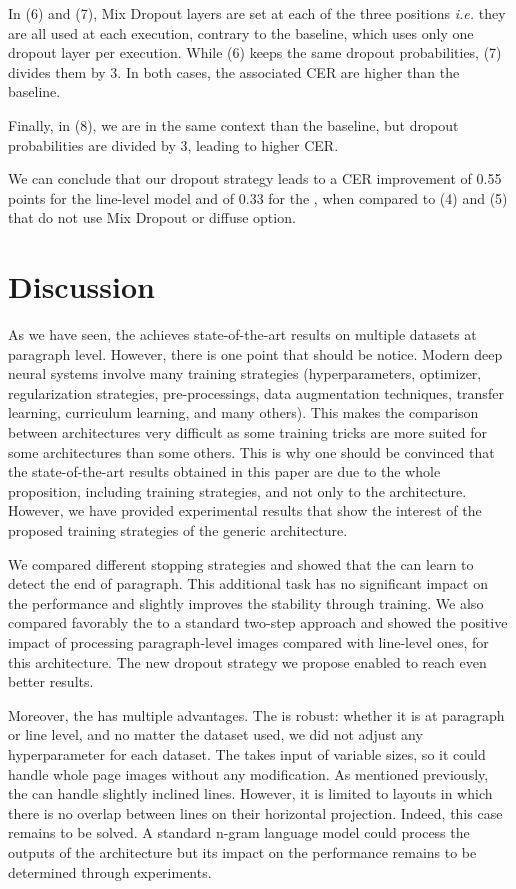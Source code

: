 In (6) and (7), Mix Dropout layers are set at each of the three positions \textit{i.e.} they are all used at each execution, contrary to the baseline, which uses only one dropout layer per execution. While (6) keeps the same dropout probabilities, (7) divides them by 3. In both cases, the associated CER are higher than the baseline.

Finally, in (8), we are in the same context than the baseline, but dropout probabilities are divided by 3, leading to higher CER.

We can conclude that our dropout strategy leads to a CER improvement of 0.55 points for the line-level model and of 0.33 for the \modelacc{}, when compared to (4) and (5) that do not use Mix Dropout or diffuse option. 



\section{Discussion}
\label{section-discussion}

As we have seen, the \modelacc{} achieves state-of-the-art results on multiple datasets at paragraph level. However, there is one point that should be notice. Modern deep neural systems involve many training strategies (hyperparameters, optimizer, regularization strategies, pre-processings, data augmentation techniques, transfer learning, curriculum learning, and many others). This makes the comparison between architectures very difficult as some training tricks are more suited for some architectures than some others. This is why one should be convinced that the state-of-the-art results obtained in this paper are due to the whole proposition, including training strategies, and not only to the \modelacc{} architecture. However, we have provided experimental results that show the interest of the proposed training strategies of the generic \modelacc{} architecture.

We compared different stopping strategies and showed that the \modelacc{} can learn to detect the end of paragraph. This additional task has no significant impact on the performance and slightly improves the stability through training. We also compared favorably the \modelacc{} to a standard two-step approach and showed the positive impact of processing paragraph-level images compared with line-level ones, for this architecture. The new dropout strategy we propose enabled to reach even better results.

Moreover, the \modelacc{} has multiple advantages. The \modelacc{} is robust: whether it is at paragraph or line level, and no matter the dataset used, we did not adjust any hyperparameter for each dataset. The \modelacc{} takes input of variable sizes, so it could handle whole page images without any modification. As mentioned previously, the \modelacc{} can handle slightly inclined lines. However, it is limited to layouts in which there is no overlap between lines on their horizontal projection. Indeed, this case remains to be solved. A standard n-gram language model could process the outputs of the \modelacc{} architecture but its impact on the performance remains to be determined through experiments. 


